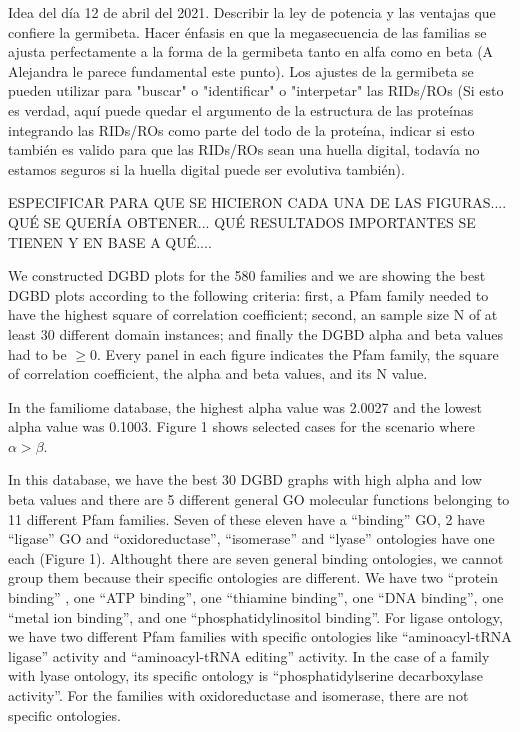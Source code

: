 \documentclass[preprint,12pt]{elsarticle}
\begin{document}
Idea del día 12 de abril del 2021. Describir la ley de potencia 
y las ventajas que confiere la germibeta. Hacer énfasis en que la 
megasecuencia de las familias se ajusta perfectamente a la forma de 
la germibeta tanto en alfa como en beta (A Alejandra le parece 
fundamental este punto). Los ajustes de la germibeta se pueden 
utilizar para "buscar" o "identificar" o "interpetar" las RIDs/ROs 
(Si esto es verdad, aquí puede quedar el argumento de la estructura 
de las proteínas integrando las RIDs/ROs como parte del todo de la 
proteína, indicar si esto también es valido para que las RIDs/ROs sean 
una huella digital, todavía no estamos seguros si la huella digital 
puede ser evolutiva también).  \par 

ESPECIFICAR PARA QUE SE HICIERON CADA UNA DE LAS FIGURAS.... 
QUÉ SE QUERÍA OBTENER... QUÉ RESULTADOS IMPORTANTES SE TIENEN Y EN 
BASE A QUÉ.... \par  

We constructed DGBD plots for the 580  families and we are showing 
the best DGBD plots according to the following criteria: first, 
a Pfam family needed to have the highest square of correlation 
coefficient; second, an sample size N of at least  30 different 
domain instances; and finally the DGBD alpha and beta values had 
to be $\ge 0$. Every panel in each figure indicates the Pfam family, 
the square of correlation coefficient, the alpha and beta values, 
and its N value. \par In the familiome database, the highest alpha 
value was 2.0027 and the lowest alpha value was 0.1003. Figure 1 
shows selected cases for the scenario where $ \alpha > \beta$.  

In this database, we have the best 30 DGBD graphs with high alpha 
and low beta values and there are 5 different general GO molecular 
functions belonging to 11 different Pfam families. Seven of these 
eleven have a ``binding'' GO, 2 have ``ligase'' GO and 
``oxidoreductase'', ``isomerase'' and ``lyase'' ontologies have 
one each (Figure 1). Althought there are seven general binding 
ontologies, we cannot group them because their specific ontologies 
are different. We have two ``protein binding'' ,  one ``ATP binding'',  
one ``thiamine binding'', one ``DNA binding'', one ``metal ion binding'', 
and one ``phosphatidylinositol binding''. For ligase ontology, we 
have two different Pfam families with specific ontologies like 
``aminoacyl-tRNA ligase'' activity and ``aminoacyl-tRNA editing'' 
activity. In the case of a family with lyase ontology, its specific 
ontology is ``phosphatidylserine decarboxylase activity''. 
For the families with oxidoreductase and isomerase, there are not 
specific ontologies. 
\end{document}
